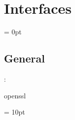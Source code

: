 
\section{Interfaces} 


\parskip = 0pt

\vspace{3mm} \subsection*{General}

: 

openssl
\vspace{2mm}

\vspace{5mm}\parskip = 10pt 

